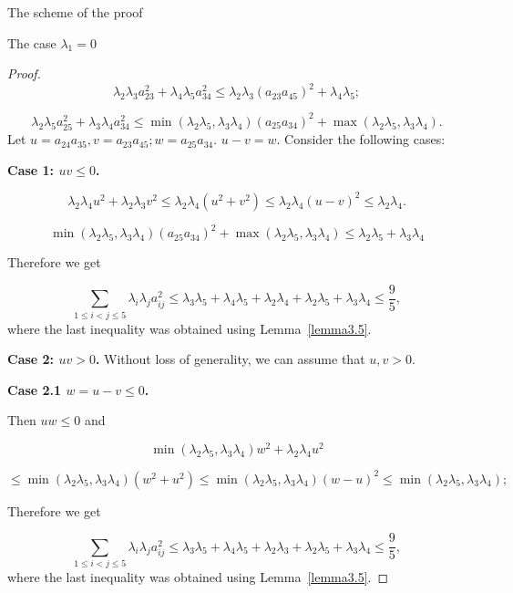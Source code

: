 \documentclass[12pt]{article}
\begin{document}
\begin{section}{The scheme of the proof}
\begin{section}{The case  \texorpdfstring{$\lambda_{1} = 0$}{Lg}}
\begin{proof}
       $$
        \lambda_{2}\lambda_{3}a_{23}^{2} + \lambda_{4}\lambda_{5}a_{34}^{2} \leq \lambda_{2}\lambda_{3}(a_{23}a_{45})^{2} + \lambda_{4}\lambda_{5};
    $$

    $$
        \lambda_{2}\lambda_{5}a_{25}^{2} + \lambda_{3}\lambda_{4}a_{34}^{2} \leq \min(\lambda_{2}\lambda_{5},\lambda_{3}\lambda_{4} )(a_{25}a_{34})^{2} + \max(\lambda_{2}\lambda_{5},\lambda_{3}\lambda_{4} ).
    $$
    Let $u=a_{24}a_{35}, v = a_{23}a_{45}; w = a_{25}a_{34}.$ $u-v=w.$  Consider the following cases:
    
    \textbf{Case 1: $uv\leq 0$.} 

    $$
        \lambda_{2}\lambda_{4}u^{2} + \lambda_{2}\lambda_{3}v^{2} \leq   \lambda_{2}\lambda_{4}(u^{2} + v^{2}) \leq \lambda_{2}\lambda_{4}(u - v)^{2} \leq \lambda_{2}\lambda_{4}.
    $$

    $$
     \min(\lambda_{2}\lambda_{5},\lambda_{3}\lambda_{4} )(a_{25}a_{34})^{2} + \max(\lambda_{2}\lambda_{5},\lambda_{3}\lambda_{4} ) \leq \lambda_{2}\lambda_{5} + \lambda_{3}\lambda_{4}
    $$

    Therefore we get
    
    $$
        \sum_{1\leq i < j\leq 5}\lambda_{i}\lambda_{j} a_{ij}^{2} \leq \lambda_{3}\lambda_{5} + \lambda_{4}\lambda_{5} + \lambda_{2}\lambda_{4} + \lambda_{2}\lambda_{5} + \lambda_{3}\lambda_{4}\leq \frac{9}{5},
    $$
    where the last inequality was obtained using Lemma~\ref{lemma3.5}. 
    
    \textbf{Case 2: $uv > 0$.}
    Without loss of generality, we can assume that 
    $u,v>0$.
    
    \textbf{Case 2.1 $w = u-v \leq 0$.}
    
    Then $ uw\leq 0$ and  

    $$
        \min(\lambda_{2}\lambda_{5},\lambda_{3}\lambda_{4} )w^{2} + \lambda_{2}\lambda_{4}u^{2}
        $$
        
        $$
        \leq \min(\lambda_{2}\lambda_{5},\lambda_{3}\lambda_{4} )(w^{2} + u^{2}) \leq \min(\lambda_{2}\lambda_{5},\lambda_{3}\lambda_{4} )(w - u)^{2} \leq \min(\lambda_{2}\lambda_{5},\lambda_{3}\lambda_{4} );
    $$

     Therefore we get
    
    $$
        \sum_{1\leq i < j\leq 5}\lambda_{i}\lambda_{j} a_{ij}^{2} \leq \lambda_{3}\lambda_{5} + \lambda_{4}\lambda_{5} + \lambda_{2}\lambda_{3} + \lambda_{2}\lambda_{5} + \lambda_{3}\lambda_{4}\leq \frac{9}{5},
    $$
    where the last inequality was obtained using Lemma~\ref{lemma3.5}.


\end{proof}
\end{section}
\end{section}
\end{document}
